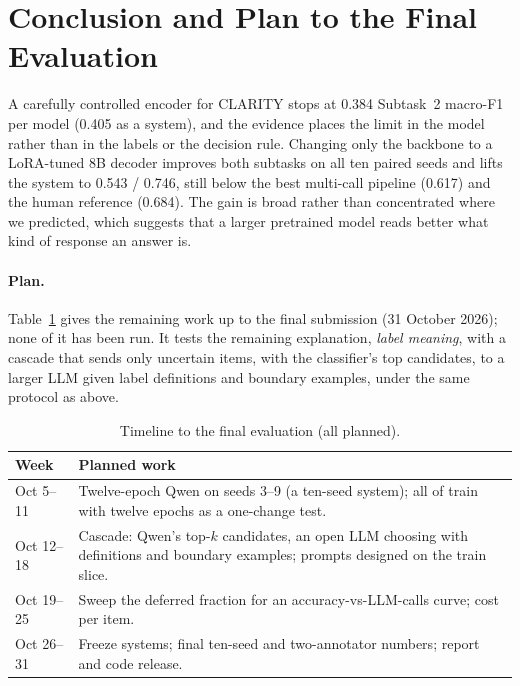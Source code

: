 \section{Conclusion and Plan to the Final Evaluation}
\label{sec:conclusion}

A carefully controlled encoder for CLARITY stops at 0.384 Subtask~2 macro-F1 per model (0.405 as a system), and the evidence places the limit in the model rather than in the labels or the decision rule.
Changing only the backbone to a LoRA-tuned 8B decoder improves both subtasks on all ten paired seeds and lifts the system to 0.543 / 0.746, still below the best multi-call pipeline (0.617) and the human reference (0.684).
The gain is broad rather than concentrated where we predicted, which suggests that a larger pretrained model reads better what kind of response an answer is.

\paragraph{Plan.}
Table~\ref{tab:timeline} gives the remaining work up to the final submission (31 October 2026); none of it has been run.
It tests the remaining explanation, \emph{label meaning}, with a cascade that sends only uncertain items, with the classifier's top candidates, to a larger LLM given label definitions and boundary examples, under the same protocol as above.

\begin{table}[t]
\centering
\small
\begin{tabular}{@{}lp{}@{}}
\toprule
Week & Planned work \\
\midrule
Oct 5--11 & Twelve-epoch Qwen on seeds 3--9 (a ten-seed system); all of train with twelve epochs as a one-change test. \\
Oct 12--18 & Cascade: Qwen's top-$k$ candidates, an open LLM choosing with definitions and boundary examples; prompts designed on the train slice. \\
Oct 19--25 & Sweep the deferred fraction for an accuracy-vs-LLM-calls curve; cost per item. \\
Oct 26--31 & Freeze systems; final ten-seed and two-annotator numbers; report and code release. \\
\bottomrule
\end{tabular}
\caption{Timeline to the final evaluation (all planned).}
\label{tab:timeline}
\end{table}
